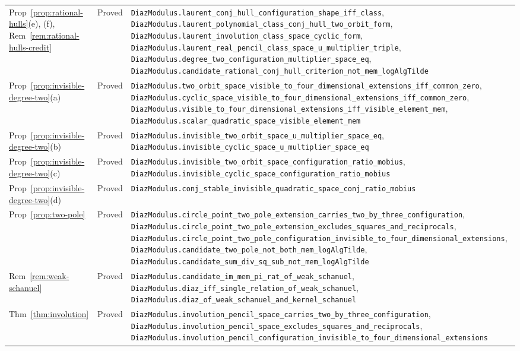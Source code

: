 \documentclass[11pt,a4paper]{article}
\theoremstyle{plain}
\theoremstyle{definition}
\begin{document}
\begin{center}
\begin{longtable}{@{}llp{6.2cm}@{}}
Prop~\ref{prop:rational-hulls}(e), (f), Rem~\ref{rem:rational-hulls-credit} & Proved & \nolinkurl{DiazModulus.laurent_conj_hull_configuration_shape_iff_class}, \nolinkurl{DiazModulus.laurent_polynomial_class_conj_hull_two_orbit_form}, \nolinkurl{DiazModulus.laurent_involution_class_space_cyclic_form}, \nolinkurl{DiazModulus.laurent_real_pencil_class_space_u_multiplier_triple}, \nolinkurl{DiazModulus.degree_two_configuration_multiplier_space_eq}, \nolinkurl{DiazModulus.candidate_rational_conj_hull_criterion_not_mem_logAlgTilde} \\
Prop~\ref{prop:invisible-degree-two}(a) & Proved & \nolinkurl{DiazModulus.two_orbit_space_visible_to_four_dimensional_extensions_iff_common_zero}, \nolinkurl{DiazModulus.cyclic_space_visible_to_four_dimensional_extensions_iff_common_zero}, \nolinkurl{DiazModulus.visible_to_four_dimensional_extensions_iff_visible_element_mem}, \nolinkurl{DiazModulus.scalar_quadratic_space_visible_element_mem} \\
Prop~\ref{prop:invisible-degree-two}(b) & Proved & \nolinkurl{DiazModulus.invisible_two_orbit_space_u_multiplier_space_eq}, \nolinkurl{DiazModulus.invisible_cyclic_space_u_multiplier_space_eq} \\
Prop~\ref{prop:invisible-degree-two}(c) & Proved & \nolinkurl{DiazModulus.invisible_two_orbit_space_configuration_ratio_mobius}, \nolinkurl{DiazModulus.invisible_cyclic_space_configuration_ratio_mobius} \\
Prop~\ref{prop:invisible-degree-two}(d) & Proved & \nolinkurl{DiazModulus.conj_stable_invisible_quadratic_space_conj_ratio_mobius} \\
Prop~\ref{prop:two-pole} & Proved & \nolinkurl{DiazModulus.circle_point_two_pole_extension_carries_two_by_three_configuration}, \nolinkurl{DiazModulus.circle_point_two_pole_extension_excludes_squares_and_reciprocals}, \nolinkurl{DiazModulus.circle_point_two_pole_configuration_invisible_to_four_dimensional_extensions}, \nolinkurl{DiazModulus.candidate_two_pole_not_both_mem_logAlgTilde}, \nolinkurl{DiazModulus.candidate_sum_div_sq_sub_not_mem_logAlgTilde} \\
Rem~\ref{rem:weak-schanuel} & Proved & \nolinkurl{DiazModulus.candidate_im_mem_pi_rat_of_weak_schanuel}, \nolinkurl{DiazModulus.diaz_iff_single_relation_of_weak_schanuel}, \nolinkurl{DiazModulus.diaz_of_weak_schanuel_and_kernel_schanuel} \\
Thm~\ref{thm:involution} & Proved & \nolinkurl{DiazModulus.involution_pencil_space_carries_two_by_three_configuration}, \nolinkurl{DiazModulus.involution_pencil_space_excludes_squares_and_reciprocals}, \nolinkurl{DiazModulus.involution_pencil_configuration_invisible_to_four_dimensional_extensions} \\

\end{longtable}
\end{center}
\end{document}
